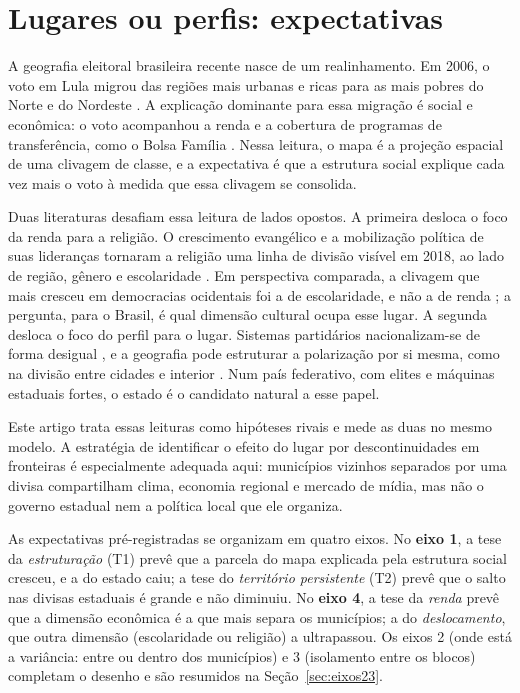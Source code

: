 \documentclass[11pt,a4paper]{article}
\begin{document}
\section{Lugares ou perfis: expectativas}

A geografia eleitoral brasileira recente nasce de um realinhamento. Em 2006, o voto em Lula migrou
das regiões mais urbanas e ricas para as mais pobres do Norte e do Nordeste
\citep{soares2008}. A explicação dominante para essa migração é social e econômica: o voto
acompanhou a renda e a cobertura de programas de transferência, como o Bolsa Família
\citep{hunter2007,zucco2008}. Nessa leitura, o mapa é a projeção espacial de uma clivagem de classe,
e a expectativa é que a estrutura social explique cada vez mais o voto à medida que essa clivagem se
consolida.

Duas literaturas desafiam essa leitura de lados opostos. A primeira desloca o foco da renda para a
religião. O crescimento evangélico e a mobilização política de suas lideranças
\citep{smith2019} tornaram a religião uma linha de divisão visível em 2018, ao lado de região,
gênero e escolaridade \citep{layton2021}. Em perspectiva comparada, a clivagem que mais cresceu em
democracias ocidentais foi a de escolaridade, e não a de renda \citep{gethin2021}; a pergunta, para o
Brasil, é qual dimensão cultural ocupa esse lugar. A segunda desloca o foco do perfil para o lugar.
Sistemas partidários nacionalizam-se de forma desigual \citep{jones2003}, e a geografia pode
estruturar a polarização por si mesma, como na divisão entre cidades e interior
\citep{rodden2019}. Num país federativo, com elites e máquinas estaduais fortes, o estado é o
candidato natural a esse papel.

Este artigo trata essas leituras como hipóteses rivais e mede as duas no mesmo modelo. A estratégia
de identificar o efeito do lugar por descontinuidades em fronteiras \citep{keele2015} é especialmente
adequada aqui: municípios vizinhos separados por uma divisa compartilham clima, economia regional e
mercado de mídia, mas não o governo estadual nem a política local que ele organiza.

As expectativas pré-registradas se organizam em quatro eixos. No \textbf{eixo 1}, a tese da
\emph{estruturação} (T1) prevê que a parcela do mapa explicada pela estrutura social cresceu, e a do
estado caiu; a tese do \emph{território persistente} (T2) prevê que o salto nas divisas estaduais é
grande e não diminuiu. No \textbf{eixo 4}, a tese da \emph{renda} prevê que a dimensão econômica é a
que mais separa os municípios; a do \emph{deslocamento}, que outra dimensão (escolaridade ou religião)
a ultrapassou. Os eixos 2 (onde está a variância: entre ou dentro dos municípios) e 3 (isolamento
entre os blocos) completam o desenho e são resumidos na Seção~\ref{sec:eixos23}.
\end{document}
